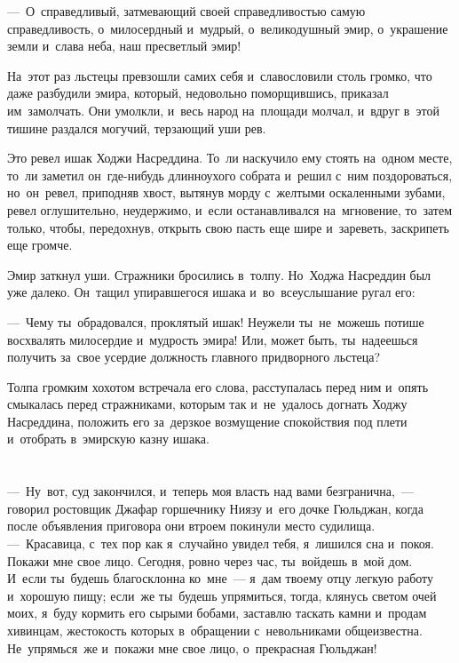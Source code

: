 \documentclass[12pt,a4paper]{book}
\begin{document}
—~О~справедливый, затмевающий своей справедливостью самую справедливость, о~милосердный и~мудрый, о~великодушный эмир, о~украшение земли и~слава неба, наш пресветлый эмир!

На~этот раз льстецы превзошли самих себя и~славословили столь громко, что даже разбудили эмира, который, недовольно поморщившись, приказал им~замолчать. Они умолкли, и~весь народ на~площади молчал, и~вдруг в~этой тишине раздался могучий, терзающий уши рев.

Это ревел ишак Ходжи Насреддина. То~ли наскучило ему стоять на~одном месте, то~ли заметил он~где-нибудь длинноухого собрата и~решил с~ним поздороваться, но~он~ревел, приподняв хвост, вытянув морду с~желтыми оскаленными зубами, ревел оглушительно, неудержимо, и~если останавливался на~мгновение, то~затем только, чтобы, передохнув, открыть свою пасть еще шире и~зареветь, заскрипеть еще громче.

Эмир заткнул уши. Стражники бросились в~толпу. Но~Ходжа Насреддин был уже далеко. Он~тащил упиравшегося ишака и~во~всеуслышание ругал его:

—~Чему ты~обрадовался, проклятый ишак! Неужели ты~не~можешь потише восхвалять милосердие и~мудрость эмира! Или, может быть, ты~надеешься получить за~свое усердие должность главного придворного льстеца?

Толпа громким хохотом встречала его слова, расступалась перед ним и~опять смыкалась перед стражниками, которым так и~не~удалось догнать Ходжу Насреддина, положить его за~дерзкое возмущение спокойствия под плети и~отобрать в~эмирскую казну ишака.


\chapter{}

—~Ну~вот, суд закончился, и~теперь моя власть над вами безгранична,~— говорил ростовщик Джафар горшечнику Ниязу и~его дочке Гюльджан, когда после объявления приговора они втроем покинули место судилища. —~Красавица, с~тех пор как я~случайно увидел тебя, я~лишился сна и~покоя. Покажи мне свое лицо. Сегодня, ровно через час, ты~войдешь в~мой дом. И~если ты~будешь благосклонна ко~мне~— я~дам твоему отцу легкую работу и~хорошую пищу; если~же ты~будешь упрямиться, тогда, клянусь светом очей моих, я~буду кормить его сырыми бобами, заставлю таскать камни и~продам хивинцам, жестокость которых в~обращении с~невольниками общеизвестна. Не~упрямься~же и~покажи мне свое лицо, о~прекрасная Гюльджан!
\end{document}
